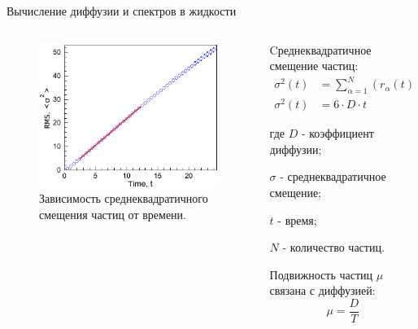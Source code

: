 \documentclass{beamer}
\begin{document}
\begin{frame}{Вычисление диффузии и спектров в жидкости}
\footnotesize{
\begin{columns}
\begin{column}{0.55\linewidth}
\begin{center}

\begin{figure}
\caption{\footnotesize Зависимость среднеквадратичного смещения частиц от времени.}
\includegraphics[width=\textwidth]{Fig_support_1.pdf}
\end{figure}
  \end{center}

\end{column}

\begin{column}{0.5\linewidth}

Cреднеквадратичное смещение частиц:
\begin{align}
    \sigma^2(t) &= \sum\limits_{\alpha = 1}^{N} (r_{\alpha}(t) - r_{\alpha}(0))^2 / N \\
    \sigma^2(t) &= 6\cdot D\cdot t
    \label{eqRMS}
\end{align}

где $D$ - коэффициент диффузии;

$\sigma$ - среднеквадратичное смещение;

$t$ - время;

$N$ - количество частиц.

\vspace{0.5cm}

Подвижность частиц $\mu$ связана с диффузией:
\begin{equation}
    \mu = \frac{D}{T}
    \label{eqMobility}
\end{equation}

\end{column}
\end{columns}


}

\end{frame}
\end{document}
